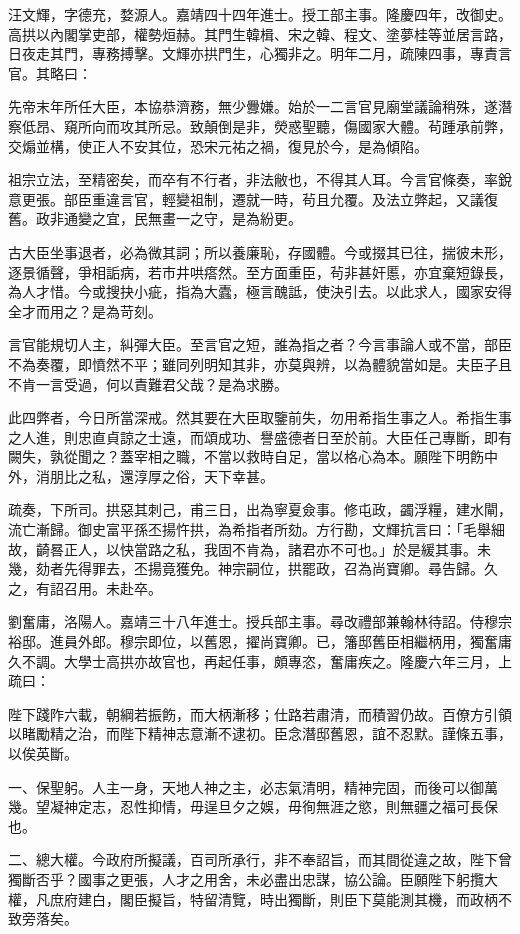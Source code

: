 \begin{pinyinscope}
{{汪文輝，字德充，婺源人。嘉靖四十四年進士。授工部主事。隆慶四年，改御史。高拱以內閣掌吏部，權勢烜赫。其門生韓楫、宋之韓、程文、塗夢桂等並居言路，日夜走其門，專務搏擊。文輝亦拱門生，心獨非之。明年二月，疏陳四事，專責言官。其略曰：

先帝末年所任大臣，本協恭濟務，無少釁嫌。始於一二言官見廟堂議論稍殊，遂潛察低昂、窺所向而攻其所忌。致顛倒是非，熒惑聖聽，傷國家大體。茍踵承前弊，交煽並構，使正人不安其位，恐宋元祐之禍，復見於今，是為傾陷。

祖宗立法，至精密矣，而卒有不行者，非法敝也，不得其人耳。今言官條奏，率銳意更張。部臣重違言官，輕變祖制，遷就一時，茍且允覆。及法立弊起，又議復舊。政非通變之宜，民無畫一之守，是為紛更。

古大臣坐事退者，必為微其詞；所以養廉恥，存國體。今或掇其已往，揣彼未形，逐景循聲，爭相詬病，若市井哄瘩然。至方面重臣，茍非甚奸慝，亦宜棄短錄長，為人才惜。今或搜抉小疵，指為大蠹，極言醜詆，使決引去。以此求人，國家安得全才而用之？是為苛刻。

言官能規切人主，糾彈大臣。至言官之短，誰為指之者？今言事論人或不當，部臣不為奏覆，即憤然不平；雖同列明知其非，亦莫與辨，以為體貌當如是。夫臣子且不肯一言受過，何以責難君父哉？是為求勝。

此四弊者，今日所當深戒。然其要在大臣取鑒前失，勿用希指生事之人。希指生事之人進，則忠直貞諒之士遠，而頌成功、譽盛德者日至於前。大臣任己專斷，即有闕失，孰從聞之？蓋宰相之職，不當以救時自足，當以格心為本。願陛下明飭中外，消朋比之私，還淳厚之俗，天下幸甚。

疏奏，下所司。拱惡其刺己，甫三日，出為寧夏僉事。修屯政，蠲浮糧，建水閘，流亡漸歸。御史富平孫丕揚忤拱，為希指者所劾。方行勘，文輝抗言曰：「毛舉細故，齮晷正人，以快當路之私，我固不肯為，諸君亦不可也。」於是緩其事。未幾，劾者先得罪去，丕揚竟獲免。神宗嗣位，拱罷政，召為尚寶卿。尋告歸。久之，有詔召用。未赴卒。

劉奮庸，洛陽人。嘉靖三十八年進士。授兵部主事。尋改禮部兼翰林待詔。侍穆宗裕邸。進員外郎。穆宗即位，以舊恩，擢尚寶卿。已，籓邸舊臣相繼柄用，獨奮庸久不調。大學士高拱亦故官也，再起任事，頗專恣，奮庸疾之。隆慶六年三月，上疏曰：

陛下踐阼六載，朝綱若振飭，而大柄漸移；仕路若肅清，而積習仍故。百僚方引領以睹勵精之治，而陛下精神志意漸不逮初。臣念潛邸舊恩，誼不忍默。謹條五事，以俟英斷。

一、保聖躬。人主一身，天地人神之主，必志氣清明，精神完固，而後可以御萬幾。望凝神定志，忍性抑情，毋逞旦夕之娛，毋徇無涯之慾，則無疆之福可長保也。

二、總大權。今政府所擬議，百司所承行，非不奉詔旨，而其間從違之故，陛下曾獨斷否乎？國事之更張，人才之用舍，未必盡出忠謀，協公論。臣願陛下躬攬大權，凡庶府建白，閣臣擬旨，特留清覽，時出獨斷，則臣下莫能測其機，而政柄不致旁落矣。

}}
\end{pinyinscope}
